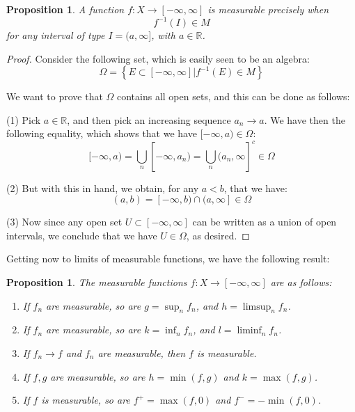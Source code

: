 \documentclass[12pt]{amsbook}
\newtheorem{proposition}[theorem]{Proposition}
\begin{document}
\begin{proposition}
A function $f:X\to[-\infty,\infty]$ is measurable precisely when 
$$f^{-1}(I)\in M$$
for any interval of type $I=(a,\infty]$, with $a\in\mathbb R$. 
\end{proposition}

\begin{proof}
Consider the following set, which is easily seen to be an algebra:
$$\Omega=\left\{E\subset[-\infty,\infty]\Big|f^{-1}(E)\in M\right\}$$

We want to prove that $\Omega$ contains all open sets, and this can be done as follows:

\medskip

(1) Pick $a\in\mathbb R$, and then pick an increasing sequence $a_n\to a$. We have then the following equality, which shows that we have $[-\infty,a)\in\Omega$:
$$[-\infty,a)=\bigcup_n[-\infty,a_n)=\bigcup_n(a_n,\infty]^c\in\Omega$$

(2) But with this in hand, we obtain, for any $a<b$, that we have:
$$(a,b)=[-\infty,b)\cap(a,\infty]\in\Omega$$

(3) Now since any open set $U\subset[-\infty,\infty]$ can be written as a union of open intervals, we conclude that we have $U\in\Omega$, as desired.
\end{proof}

Getting now to limits of measurable functions, we have the following result:

\begin{proposition}
The measurable functions $f:X\to[-\infty,\infty]$ are as follows:
\begin{enumerate}
\item If $f_n$ are measurable, so are $g=\sup_nf_n$, and $h=\limsup_nf_n$.

\item If $f_n$ are measurable, so are $k=\inf_nf_n$, and $l=\liminf_nf_n$.

\item If $f_n\to f$ and $f_n$ are measurable, then $f$ is measurable.

\item If $f,g$ are measurable, so are $h=\min(f,g)$ and $k=\max(f,g)$.

\item If $f$ is measurable, so are $f^+=\max(f,0)$ and $f^-=-\min(f,0)$.
\end{enumerate}
\end{proposition}
\end{document}
